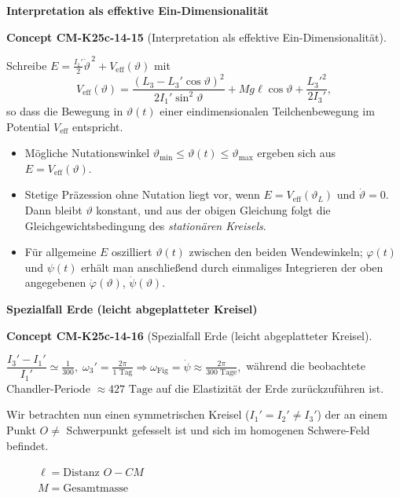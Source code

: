 \documentclass[10pt, letterpaper]{article}
\newcommand{\CustomHeading}[3]{%
  \par\medskip\noindent%
  \textbf{#1 #2} \textnormal{(#3)}.\enskip%
}
\newenvironment{CONC}[2]{\begin{unitbox}\CustomHeading{Concept}{#1}{#2}}{\end{unitbox}}
\begin{document}
\textbf{Interpretation als effektive Ein-Dimensionalität}\\

\begin{CONC}{CM-K25c-14-15}{Interpretation als effektive Ein-Dimensionalität}
Schreibe $E= \tfrac{I_1'}{2}\dot\vartheta^{\,2}+V_{\text{eff}}(\vartheta)$ mit
\[
V_{\text{eff}}(\vartheta)=
  \frac{(L_3-L_3'\cos\vartheta)^{2}}{2I_1'\sin^{2}\vartheta}
  +Mg\ell\cos\vartheta+\frac{L_3'^{2}}{2I_3'} ,
\]
so dass die Bewegung in $\vartheta(t)$ einer eindimensionalen Teilchenbewegung im Potential $V_{\text{eff}}$ entspricht.  
\begin{itemize}
\item Mögliche Nutationswinkel $\vartheta_{\min}\le\vartheta(t)\le\vartheta_{\max}$ ergeben sich aus \(E=V_{\text{eff}}(\vartheta)\).
\item Stetige Präzession ohne Nutation liegt vor, wenn $E=V_{\text{eff}}(\vartheta_L)$ und $\dot\vartheta=0$. Dann bleibt $\vartheta$ konstant, und aus der obigen Gleichung folgt die Gleichgewichtsbedingung des \emph{stationären Kreisels}.
\item Für allgemeine $E$ oszilliert $\vartheta(t)$ zwischen den beiden Wendewinkeln; $\varphi(t)$ und $\psi(t)$ erhält man anschließend durch einmaliges Integrieren der oben angegebenen $\dot\varphi(\vartheta)$, $\dot\psi(\vartheta)$.
\end{itemize}
\end{CONC}

\textbf{Spezialfall Erde (leicht abgeplatteter Kreisel)}


\begin{CONC}{CM-K25c-14-16}{Spezialfall Erde (leicht abgeplatteter Kreisel}
\(
\dfrac{I_3'-I_1'}{I_1'}\simeq \tfrac1{300},\;
\omega_3'=\tfrac{2\pi}{1\text{ Tag}}
\Longrightarrow
\omega_{\text{Fig}}=\dot\psi\approx \tfrac{2\pi}{300\text{ Tage}},
\)
während die beobachtete Chandler-Periode \( \approx 427\text{ Tage} \)
auf die Elastizität der Erde zurückzuführen ist.
\end{CONC}








Wir betrachten nun einen symmetrischen Kreisel ($I_1'=I_2' \neq I_3'$) der an einem Punkt $O \neq$ Schwerpunkt gefesselt ist und sich im homogenen Schwere-Feld befindet.

\begin{figure}[h]
\centering
{}
\caption*{$\ell = \text{Distanz }O-CM$\\
$M = \text{Gesamtmasse}$}
\end{figure}
\end{document}
